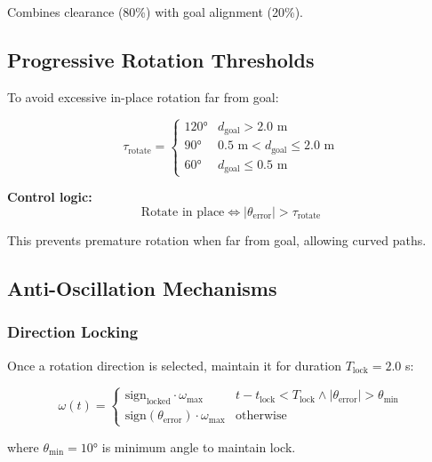 Combines clearance (80\%) with goal alignment (20\%).

\subsection{Progressive Rotation Thresholds}

To avoid excessive in-place rotation far from goal:

\begin{equation}
\tau_{\text{rotate}} = \begin{cases}
120° & d_{\text{goal}} > 2.0 \text{ m} \\
90° & 0.5 \text{ m} < d_{\text{goal}} \leq 2.0 \text{ m} \\
60° & d_{\text{goal}} \leq 0.5 \text{ m}
\end{cases}
\label{eq:progressive_thresholds}
\end{equation}

\textbf{Control logic:}
\begin{equation}
\text{Rotate in place} \iff |\theta_{\text{error}}| > \tau_{\text{rotate}}
\label{eq:rotation_condition}
\end{equation}

This prevents premature rotation when far from goal, allowing curved paths.

\subsection{Anti-Oscillation Mechanisms}

\subsubsection{Direction Locking}

Once a rotation direction is selected, maintain it for duration $T_{\text{lock}} = 2.0$ s:

\begin{equation}
\omega(t) = \begin{cases}
\text{sign}_{\text{locked}} \cdot \omega_{\max} & t - t_{\text{lock}} < T_{\text{lock}} \land |\theta_{\text{error}}| > \theta_{\min} \\
\text{sign}(\theta_{\text{error}}) \cdot \omega_{\max} & \text{otherwise}
\end{cases}
\label{eq:direction_locking}
\end{equation}

where $\theta_{\min} = 10°$ is minimum angle to maintain lock.

